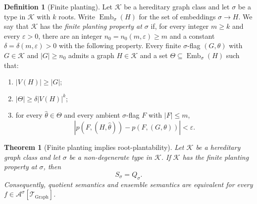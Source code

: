 \documentclass[11pt]{article}
\newtheorem{theorem}{Theorem}
\theoremstyle{definition}
\newtheorem{definition}[definition]{Definition}
\newcommand{\A}{\mathcal{A}}
\newcommand{\K}{\mathcal{K}}
\newcommand{\T}{\mathcal{T}}
\newcommand{\Emb}{\operatorname{Emb}}
\newcommand{\eps}{\varepsilon}
\begin{document}
\begin{definition}[Finite planting]\label{def:finite-local-planting}
Let $\K$ be a hereditary graph class and let $\sigma$ be a type in $\K$ with
$k$ roots.  Write $\Emb_\sigma(H)$ for the set of embeddings
$\sigma\to H$.  We say that $\K$ has the \emph{finite planting property at
$\sigma$} if, for every integer $m\ge k$ and every $\eps>0$, there are an integer
$n_0=n_0(m,\eps)\ge m$ and a constant $\delta=\delta(m,\eps)>0$ with the following
property.
Every finite $\sigma$-flag $(G,\theta)$ with $G\in\K$ and $|G|\ge n_0$ admits a graph
$H\in\K$ and a set $\Theta\subseteq\Emb_\sigma(H)$ such that:
\begin{enumerate}[label=\textup{(\roman*)}, leftmargin=2.5em]
  \item $|V(H)|\ge |G|$;
  \item $|\Theta|\ge \delta |V(H)|^k$;
  \item for every $\widehat\theta\in\Theta$ and every ambient $\sigma$-flag $F$
        with $|F|\le m$,
        \[
          \left|p(F,(H,\widehat\theta))-p(F,(G,\theta))\right|<\eps .
        \]
\end{enumerate}
\end{definition}

\begin{theorem}[Finite planting implies root-plantability]\label{thm:finite-local-planting}
Let $\K$ be a hereditary graph class and let $\sigma$ be a non-degenerate type
in $\K$.  If $\K$ has the finite planting property at $\sigma$, then
\[
  S_\sigma=Q_\sigma.
\]
Consequently, quotient semantics and ensemble semantics are equivalent for every
$f\in\A^\sigma[\T_{\mathrm{Graph}}]$.
\end{theorem}
\end{document}
